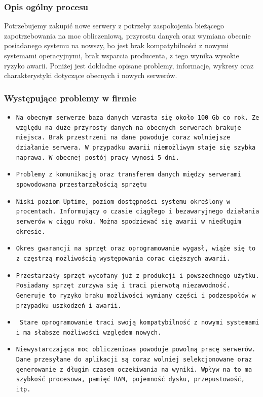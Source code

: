 \documentclass[a4paper, 12pt]{article}
\begin{document}
\subsubsection{Opis ogólny procesu}
\hspace*{1cm} Potrzebujemy zakupić nowe serwery z potrzeby zaspokojenia bieżącego zapotrzebowania na moc obliczeniową, przyrostu danych oraz wymiana obecnie posiadanego systemu na nowszy, bo jest brak kompatybilności z nowymi systemami operacyjnymi, brak wsparcia producenta, z tego wynika wysokie ryzyko awarii. Poniżej jest dokładne opisane problemy, informacje, wykresy oraz charakterystyki dotyczące obecnych i nowych serwerów.\newline
\subsubsection{Występujące problemy w firmie} 
		\begin{itemize}
		        \item \texttt{Na obecnym serwerze baza danych wzrasta się około 100 Gb co rok. Ze względu na duże przyrosty danych na obecnych serwerach brakuje miejsca. Brak przestrzeni na dane powoduje coraz wolniejsze działanie serwera. W przypadku awarii niemożliwym staje się szybka naprawa. W obecnej postój pracy wynosi 5 dni.}
	        	\item \texttt{Problemy z komunikacją oraz transferem danych między serwerami spowodowana przestarzałością sprzętu}
	        	\item \texttt{Niski poziom Uptime, poziom dostępności systemu określony w procentach. Informujący o czasie ciągłego i bezawaryjnego działania serwerów w ciągu roku. Można spodziewać się awarii w niedługim okresie.}
	        	\item \texttt{Okres gwarancji na sprzęt oraz oprogramowanie wygasł, wiąże się to z częstrzą możliwością występowania corac cięższych awarii.}
	        	\item \texttt{Przestarzały sprzęt wycofany już z produkcji i powszechnego użytku. Posiadany sprzęt zurzywa się i traci pierwotą niezawodność. Generuje to ryzyko braku możliwości wymiany części i podzespołów w przypadku uszkodzeń i awarii.}
	        	\item \texttt{ Stare oprogramowanie traci swoją kompatybilność z nowymi systemami i ma słabsze możliwości względem nowych.}
	        	\item \texttt{Niewystarczająca moc obliczeniowa powoduje powolną pracę serwerów. Dane przesyłane do aplikacji są coraz wolniej selekcjonowane oraz generowanie z długim czasem oczekiwania na wyniki. Wpływ na to ma szybkość procesowa, pamięć RAM, pojemność dysku, przepustowość, itp.}
		    \end{itemize}
\end{document}
